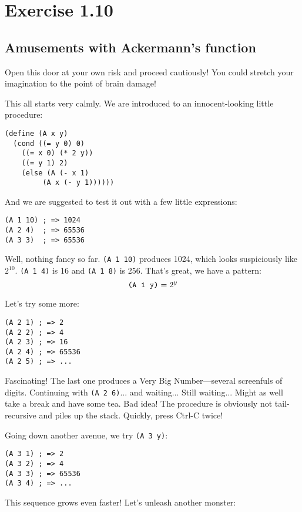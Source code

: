 \documentclass{article}
\begin{document}
\section*{Exercise 1.10}

\subsection*{Amusements with Ackermann's function}

Open this door at your own risk and proceed cautiously! You could stretch
your imagination to the point of brain damage!

This all starts very calmly. We are introduced to an innocent-looking little 
procedure:

\begin{Verbatim}
(define (A x y)
  (cond ((= y 0) 0)
	((= x 0) (* 2 y))
	((= y 1) 2)
	(else (A (- x 1)
		 (A x (- y 1))))))
\end{Verbatim}

And we are suggested to test it out with a few little expressions:

\begin{Verbatim}
(A 1 10) ; => 1024
(A 2 4)  ; => 65536
(A 3 3)  ; => 65536
\end{Verbatim}

Well, nothing fancy so far. {\tt (A 1 10)} produces 1024, which looks
suspiciously like $2^{10}$. {\tt (A 1 4)} is 16 and {\tt (A 1 8)} is 256. 
That's great, we have a pattern:
$$ \hbox{\tt (A 1 y)} = 2^y $$

Let's try some more: 

\begin{Verbatim}
(A 2 1) ; => 2
(A 2 2) ; => 4
(A 2 3) ; => 16
(A 2 4) ; => 65536
(A 2 5) ; => ...
\end{Verbatim}

Fascinating! The last one produces a Very Big Number---several screenfuls 
of digits. Continuing with {\tt (A 2 6)}... and waiting... Still waiting... 
Might as well take a break and have some tea. Bad idea! The procedure is 
obviously not tail-recursive and piles up the stack. Quickly, press Ctrl-C 
twice!

Going down another avenue, we try {\tt (A 3 y)}:

\begin{Verbatim}
(A 3 1) ; => 2
(A 3 2) ; => 4
(A 3 3) ; => 65536
(A 3 4) ; => ...
\end{Verbatim}

This sequence grows even faster! Let's unleash another monster:
\end{document}
